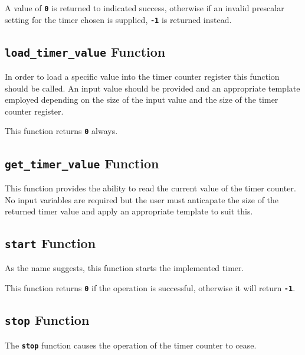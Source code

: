 \documentclass[a4paper, oneside, 11pt, titlepage, onecolumn, openright]{report}
\begin{document}
A value of \textbf{\texttt{0}} is returned to indicated success, otherwise if an invalid prescalar setting for the timer chosen is supplied, \textbf{\texttt{-1}} is returned instead.
			
				\subsection{\textbf{\texttt{load\_timer\_value}} Function}
					\label{ss:Hardware Abstraction Libraries:tc Module:load_timer_value Function}
			
					In order to load a specific value into the timer counter register this function should be called. An input value should be provided and an appropriate template employed depending on the size of the input value and the size of the timer counter register.
			
This function returns \textbf{\texttt{0}} always.
			
				\subsection{\textbf{\texttt{get\_timer\_value}} Function}
					\label{ss:Hardware Abstraction Libraries:tc Module:get_timer_value Function}
			
					This function provides the ability to read the current value of the timer counter. No input variables are required but the user must anticapate the size of the returned timer value and apply an appropriate template to suit this.
			
				\subsection{\textbf{\texttt{start}} Function}
					\label{ss:Hardware Abstraction Libraries:tc Module:start Function}
			
					As the name suggests, this function starts the implemented timer.
			
This function returns \textbf{\texttt{0}} if the operation is successful, otherwise it will return \textbf{\texttt{-1}}. 
						
				\subsection{\textbf{\texttt{stop}} Function}
					\label{ss:Hardware Abstraction Libraries:tc Module:stop Function}
			
					The \textbf{\texttt{stop}} function causes the operation of the timer counter to cease.
			
\end{document}
